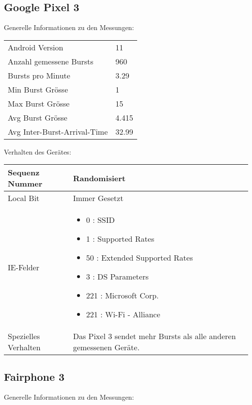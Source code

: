 \subsection*{Google Pixel 3}
Generelle Informationen zu den Messungen:

\begin{table}[h!]
    \begin{tabularx}{\textwidth}{l X }
        \toprule
        Android Version & 11 \\
        Anzahl gemessene Bursts & 960 \\
        Bursts pro Minute & 3.29 \\
        Min Burst Grösse & 1 \\
        Max Burst Grösse & 15 \\
        Avg Burst Grösse & 4.415 \\
        Avg Inter-Burst-Arrival-Time & 32.99 \\
        \bottomrule
    \end{tabularx}
\end{table}

Verhalten des Gerätes:

\begin{table}[h!]
    \begin{tabularx}{\textwidth}{l X }
        \toprule
        Sequenz Nummer & Randomisiert \\
        \midrule
        Local Bit & Immer Gesetzt \\
        \midrule
        IE-Felder & \begin{itemize}
            \item 0 : SSID
            \item 1 : Supported Rates
            \item 50 : Extended Supported Rates
            \item 3 : DS Parameters
            \item 221 : Microsoft Corp.
            \item 221 : Wi-Fi - Alliance
        \end{itemize} \\
        \midrule
        Spezielles Verhalten & Das Pixel 3 sendet mehr Bursts als alle anderen gemessenen Geräte. \\
        \bottomrule
    \end{tabularx}
\end{table}
\clearpage


\subsection*{Fairphone 3}
Generelle Informationen zu den Messungen:

